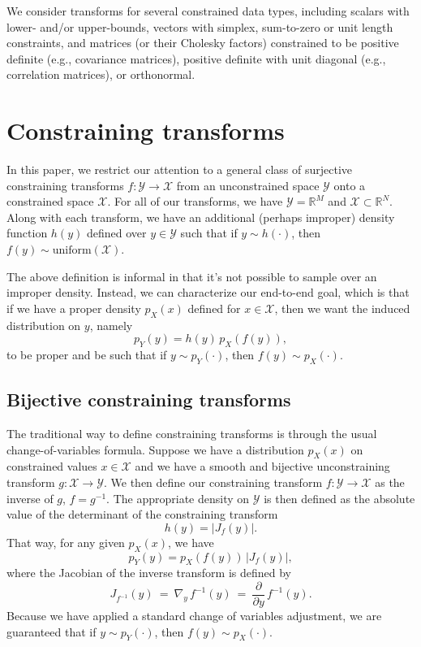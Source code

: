 \documentclass[11pt]{article}
\newcommand{\abs}[1]{\left| #1 \right|}
\newcommand{\absdet}[1]{\abs{#1}}
\begin{document}
We consider transforms for several constrained data types, including scalars with lower- and/or upper-bounds, vectors with simplex, sum-to-zero or unit length constraints, and matrices (or their Cholesky factors) constrained to be positive definite (e.g., covariance matrices), positive definite with unit diagonal (e.g., correlation matrices), or orthonormal.  

\section{Constraining transforms}

In this paper, we restrict our attention to a general class of surjective constraining transforms $f : \mathcal{Y} \rightarrow \mathcal{X}$ from an unconstrained space $\mathcal{Y}$ onto a constrained space $\mathcal{X}$.  For all of our transforms, we have $\mathcal{Y} = \mathbb{R}^M$ and $\mathcal{X} \subset \mathbb{R}^N$.  Along with each transform, we have an additional (perhaps improper) density function $h(y)$ defined over $y \in \mathcal{Y}$ such that if $y \sim h(\cdot)$, then $f(y) \sim \textrm{uniform}(\mathcal{X}).$  

The above definition is informal in that it's not possible to sample over an improper density.  Instead, we can characterize our end-to-end goal, which is that if we have a proper density $p_X(x)$ defined for $x \in \mathcal{X}$, then we want the induced distribution on $y$, namely
$$
p_Y(y) = h(y) \, p_X(f(y)),
$$
to be proper and be such that if $y \sim p_Y(\cdot)$, then $f(y) \sim p_X(\cdot)$.

\subsection{Bijective constraining transforms}

The traditional way to define constraining transforms is through the usual change-of-variables formula.  Suppose we have a distribution $p_X(x)$ on constrained values $x \in \mathcal{X}$ and we have a smooth and bijective unconstraining transform $g : \mathcal{X} \rightarrow \mathcal{Y}$.  We then define our constraining transform $f : \mathcal{Y} \rightarrow \mathcal{X}$ as the inverse of $g$, $f = g^{-1}$.  The appropriate density on $\mathcal{Y}$ is then defined as the absolute value of the determinant of the constraining transform
\[
h(y) = \absdet{J_f(y)}.
\]
That way, for any given $p_X(x)$, we have
\[
p_Y(y) = p_X(f(y)) \, \absdet{J_f(y)},
\]
where the Jacobian of the inverse transform is defined by
\[
  J_{f^{-1}}(y) \ = \ \nabla_y \, f^{-1}(y) \ = \ \frac{\partial}{\partial y} \, f^{-1}(y).
\]
Because we have applied a standard change of variables adjustment, we are guaranteed that if $y \sim p_Y(\cdot)$, then $f(y) \sim p_X(\cdot)$.
\end{document}
